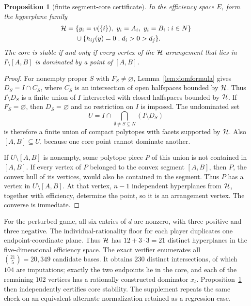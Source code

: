 \documentclass[11pt]{article}
\newtheorem{proposition}[theorem]{Proposition}
\begin{document}
\begin{proposition}[finite segment-core certificate]\label{prop:arrangement}
In the efficiency space $E$, form the hyperplane family
\[
\begin{split}
 {\cal H}={}&
 \{y_i=v(\{i\}),\ y_i=A_i,\ y_i=B_i:i\in N\}\\
 &{}\cup
 \{h_{ij}(y)=0:d_i>0>d_j\}.
\end{split}
\]
The core is stable if and only if every vertex of the ${\cal H}$-arrangement
that lies in $I\setminus[A,B]$ is dominated by a point of $[A,B]$.
\end{proposition}

\begin{proof}
For nonempty proper $S$ with $F_S\ne\varnothing$, Lemma~\ref{lem:domformula}
gives $D_S=I\cap C_S$, where $C_S$ is an intersection of open halfspaces
bounded by ${\cal H}$. Thus $I\setminus D_S$ is a finite union of $I$
intersected with closed halfspaces bounded by ${\cal H}$. If
$F_S=\varnothing$, then $D_S=\varnothing$ and no restriction on $I$ is imposed.
The undominated set
\[
 U=I\cap\bigcap_{\emptyset\ne S\subsetneq N}(I\setminus D_S)
\]
is therefore a finite union of compact polytopes with facets supported by
${\cal H}$. Also $[A,B]\subseteq U$, because one core point cannot dominate
another.

If $U\setminus[A,B]$ is nonempty, some polytope piece $P$ of this union is not
contained in $[A,B]$. If every vertex of $P$ belonged to the convex segment
$[A,B]$, then $P$, the convex hull of its vertices, would also be contained
in the segment. Thus $P$ has a vertex in $U\setminus[A,B]$. At that vertex,
$n-1$ independent hyperplanes from ${\cal H}$, together with efficiency,
determine the point, so it is an arrangement vertex. The converse is
immediate.
\end{proof}

For the perturbed game, all six entries of $d$ are nonzero, with three
positive and three negative. The individual-rationality floor for each player
duplicates one endpoint-coordinate plane. Thus ${\cal H}$ has
$12+3\cdot3=21$ distinct hyperplanes in the five-dimensional efficiency
space. The exact verifier enumerates all $\binom{21}{5}=20{,}349$ candidate
bases. It obtains $230$ distinct intersections, of which $104$ are
imputations; exactly the two endpoints lie in the core, and each of the
remaining $102$ vertices has a rationally constructed dominator $x_t$.
Proposition~\ref{prop:arrangement} then independently certifies core
stability. The supplement repeats the same check on an equivalent alternate
normalization retained as a regression case.
\end{document}
